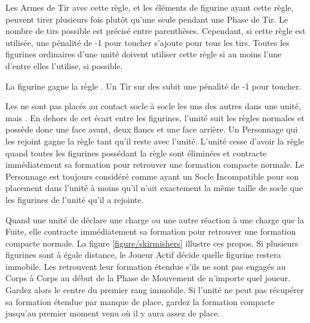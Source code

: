 
Les Armes de Tir avec cette règle, et les éléments de figurine ayant cette règle, peuvent tirer plusieurs fois plutôt qu'une seule pendant une Phase de Tir. Le nombre de tirs possible est précisé entre parenthèses. Cependant, si cette règle est utilisée, une pénalité de -1 pour toucher s'ajoute pour tous les tirs. Toutes les figurines ordinaires d'une unité doivent utiliser cette règle si au moins l'une d'entre elles l'utilise, si possible.


La figurine gagne la règle \newfromWHB{\lighttroops}. Un Tir sur des \skirmishers{} subit une pénalité de -1 pour toucher.

Les \skirmishers{} ne sont pas placés au contact socle à socle les uns des autres dans une unité, mais . En dehors de cet écart entre les figurines, l'unité suit les règles normales et possède donc une face avant, deux flancs et une face arrière.  Un Personnage qui les rejoint gagne la règle \skirmisher{} tant qu'il reste avec l'unité. L'unité cesse d'avoir la règle \skirmisher{} quand toutes les figurines possédant la règle sont éliminées et contracte immédiatement sa formation pour retrouver une formation compacte normale. Le Personnage est toujours considéré comme ayant un Socle Incompatible pour son placement dans l'unité à moins qu'il n'ait exactement la même taille de socle que les figurines de l'unité qu'il a rejointe.

Quand une unité de \skirmishers{} déclare une charge ou une autre réaction à une charge que la Fuite, elle contracte immédiatement sa formation pour retrouver une formation compacte normale.  La figure \ref{figure/skirmishers} illustre ces propos. Si plusieurs figurines sont à égale distance, le Joueur Actif décide quelle figurine restera immobile. Les \skirmishers{} retrouvent leur formation étendue s'ils ne sont pas engagés au Corps à Corps au début de la Phase de Mouvement de n'importe quel joueur. Gardez alors le centre du premier rang immobile. Si l'unité ne peut pas récupérer sa formation étendue par manque de place, gardez la formation compacte jusqu'au premier moment venu où il y aura assez de place.

